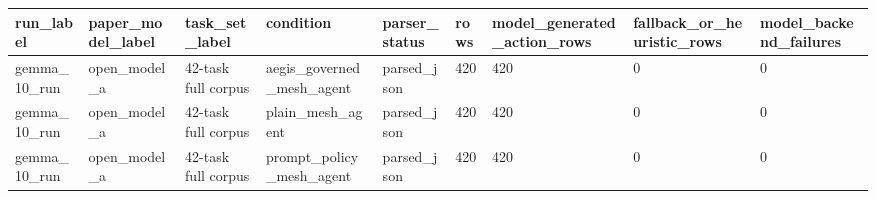 \begin{tabular}{lllllllll}
 \hline
run\_label & paper\_model\_label & task\_set\_label & condition & parser\_status & rows & model\_generated\_action\_rows & fallback\_or\_heuristic\_rows & model\_backend\_failures \\
 \hline
gemma\_10\_run & open\_model\_a & 42-task full corpus & aegis\_governed\_mesh\_agent & parsed\_json & 420 & 420 & 0 & 0 \\
gemma\_10\_run & open\_model\_a & 42-task full corpus & plain\_mesh\_agent & parsed\_json & 420 & 420 & 0 & 0 \\
gemma\_10\_run & open\_model\_a & 42-task full corpus & prompt\_policy\_mesh\_agent & parsed\_json & 420 & 420 & 0 & 0 \\
 \hline
\end{tabular}
